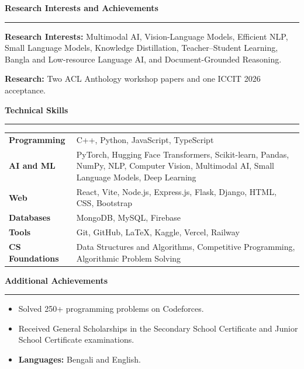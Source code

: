 \documentclass[11pt,a4paper]{article}
\newcommand{\cvsection}[1]{%
  \needspace{3\baselineskip}%
  \vspace{4pt}%
  {\Large\bfseries #1}\par
  \vspace{2pt}\hrule\vspace{4pt}%
}
\begin{document}
\cvsection{Research Interests and Achievements}
\textbf{Research Interests:} Multimodal AI, Vision-Language Models, Efficient NLP, Small Language
Models, Knowledge Distillation, Teacher--Student Learning, Bangla and Low-resource Language AI,
and Document-Grounded Reasoning.\par\vspace{4pt}
\textbf{Research:} Two ACL Anthology workshop papers and one ICCIT 2026 acceptance.

\cvsection{Technical Skills}
\begin{tabularx}{\textwidth}{@{}>{\bfseries}p{1.35in}X@{}}
  Programming & C++, Python, JavaScript, TypeScript \\
  AI and ML & PyTorch, Hugging Face Transformers, Scikit-learn, Pandas, NumPy, NLP, Computer Vision, Multimodal AI, Small Language Models, Deep Learning \\
  Web & React, Vite, Node.js, Express.js, Flask, Django, HTML, CSS, Bootstrap \\
  Databases & MongoDB, MySQL, Firebase \\
  Tools & Git, GitHub, LaTeX, Kaggle, Vercel, Railway \\
  CS Foundations & Data Structures and Algorithms, Competitive Programming, Algorithmic Problem Solving
\end{tabularx}

\cvsection{Additional Achievements}
\begin{itemize}
  \item Solved 250+ programming problems on Codeforces.
  \item Received General Scholarships in the Secondary School Certificate and Junior School Certificate examinations.
  \item \textbf{Languages:} Bengali and English.
\end{itemize}

\vspace*{\fill}
\end{document}
